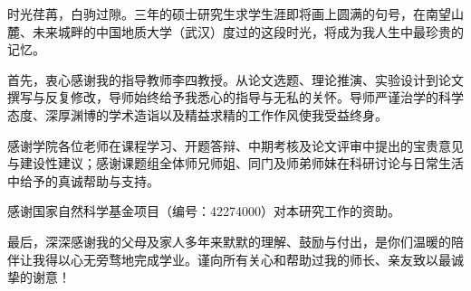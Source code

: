 \begin{acknowledgements}
时光荏苒，白驹过隙。三年的硕士研究生求学生涯即将画上圆满的句号，在南望山麓、未来城畔的中国地质大学（武汉）度过的这段时光，将成为我人生中最珍贵的记忆。

首先，衷心感谢我的指导教师李四教授。从论文选题、理论推演、实验设计到论文撰写与反复修改，导师始终给予我悉心的指导与无私的关怀。导师严谨治学的科学态度、深厚渊博的学术造诣以及精益求精的工作作风使我受益终身。

感谢学院各位老师在课程学习、开题答辩、中期考核及论文评审中提出的宝贵意见与建设性建议；感谢课题组全体师兄师姐、同门及师弟师妹在科研讨论与日常生活中给予的真诚帮助与支持。

感谢国家自然科学基金项目（编号：42274000）对本研究工作的资助。

最后，深深感谢我的父母及家人多年来默默的理解、鼓励与付出，是你们温暖的陪伴让我得以心无旁骛地完成学业。谨向所有关心和帮助过我的师长、亲友致以最诚挚的谢意！
\end{acknowledgements}
